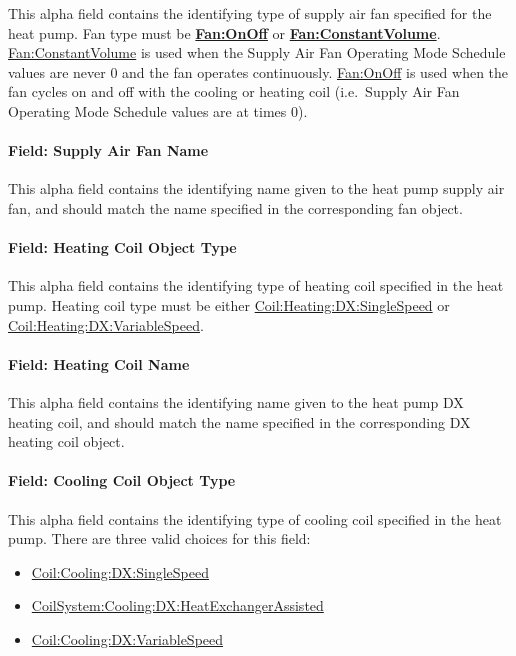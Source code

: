 This alpha field contains the identifying type of supply air fan specified for the heat pump. Fan type must be \textbf{\hyperref[fanonoff]{Fan:OnOff}} or \textbf{\hyperref[fanconstantvolume]{Fan:ConstantVolume}}. \hyperref[fanconstantvolume]{Fan:ConstantVolume} is used when the Supply Air Fan Operating Mode Schedule values are never 0 and the fan operates continuously. \hyperref[fanonoff]{Fan:OnOff} is used when the fan cycles on and off with the cooling or heating coil (i.e.~Supply Air Fan Operating Mode Schedule values are at times 0).

\paragraph{Field: Supply Air Fan Name}\label{field-supply-air-fan-name}

This alpha field contains the identifying name given to the heat pump supply air fan, and should match the name specified in the corresponding fan object.

\paragraph{Field: Heating Coil Object Type}\label{field-heating-coil-object-type-3}

This alpha field contains the identifying type of heating coil specified in the heat pump. Heating coil type must be either \hyperref[coilheatingdxsinglespeed]{Coil:Heating:DX:SingleSpeed} or \hyperref[coilheatingdxvariablespeed]{Coil:Heating:DX:VariableSpeed}.

\paragraph{Field: Heating Coil Name}\label{field-heating-coil-name-3}

This alpha field contains the identifying name given to the heat pump DX heating coil, and should match the name specified in the corresponding DX heating coil object.

\paragraph{Field: Cooling Coil Object Type}\label{field-cooling-coil-object-type-3}

This alpha field contains the identifying type of cooling coil specified in the heat pump. There are three valid choices for this field:

\begin{itemize}
\item
  \hyperref[coilcoolingdxsinglespeed]{Coil:Cooling:DX:SingleSpeed}
\item
  \hyperref[coilsystemcoolingdxheatexchangerassisted]{CoilSystem:Cooling:DX:HeatExchangerAssisted}
\item
  \hyperref[coilcoolingdxvariablespeed]{Coil:Cooling:DX:VariableSpeed}
\end{itemize}

